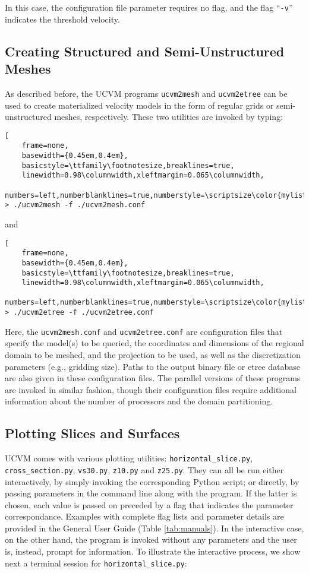 \noindent
In this case, the configuration file parameter requires no flag, and the flag ``\texttt{-v}'' indicates the threshold velocity.

\subsection{Creating Structured and Semi-Unstructured Meshes}

As described before, the UCVM programs \texttt{ucvm2mesh} and \texttt{ucvm2etree} can be used to create materialized velocity models in the form of regular grids or semi-unstructured meshes, respectively. These two utilities are invoked by typing:

\begin{lstlisting}[
	frame=none,
	basewidth={0.45em,0.4em},
	basicstyle=\ttfamily\footnotesize,breaklines=true,
	linewidth=0.98\columnwidth,xleftmargin=0.065\columnwidth,
	numbers=left,numberblanklines=true,numberstyle=\scriptsize\color{mylistingnclr}]
> ./ucvm2mesh -f ./ucvm2mesh.conf
\end{lstlisting}

\noindent
and

\begin{lstlisting}[
	frame=none,
	basewidth={0.45em,0.4em},
	basicstyle=\ttfamily\footnotesize,breaklines=true,
	linewidth=0.98\columnwidth,xleftmargin=0.065\columnwidth,
	numbers=left,numberblanklines=true,numberstyle=\scriptsize\color{mylistingnclr}]
> ./ucvm2etree -f ./ucvm2etree.conf
\end{lstlisting}

\noindent
Here, the \texttt{ucvm2mesh.conf} and \texttt{ucvm2etree.conf} are configuration files that specify the model(s) to be queried, the coordinates and dimensions of the regional domain to be meshed, and the projection to be used, as well as the discretization parameters (e.g., gridding size). Paths to the output binary file or etree database are also given in these configuration files. The parallel versions of these programs are invoked in similar fashion, though their configuration files require additional information about the number of processors and the domain partitioning.

\subsection{Plotting Slices and Surfaces}

UCVM comes with various plotting utilities: \texttt{horizontal\_slice.py}, \texttt{cross\_section.py}, \texttt{vs30.py}, \texttt{z10.py} and \texttt{z25.py}. They can all be run either interactively, by simply invoking the corresponding Python script; or directly, by passing parameters in the command line along with the program. If the latter is chosen, each value is passed on preceded by a flag that indicates the parameter correspondance. Examples with complete flag lists and parameter details are provided in the General User Guide (Table \ref{tab:manuals}). In the interactive case, on the other hand, the program is invoked without any parameters and the user is, instead, prompt for information. To illustrate the interactive process, we show next a terminal session for \texttt{horizontal\_slice.py}:

